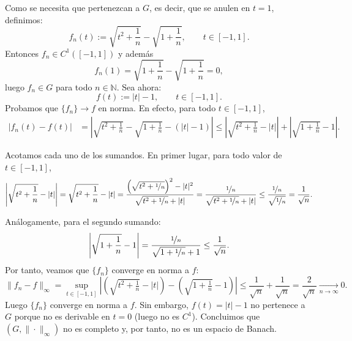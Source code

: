 \documentclass[12pt]{article}
\begin{document}
\begin{ejercicio}[3 puntos]
\begin{enumerate}[label=\alph*)]
\begin{description}
            Como se necesita que pertenezcan a $G$, es decir, que se anulen en $t=1$, definimos:
            \[
            f_n(t):=\sqrt{t^2+\frac{1}{n}}-\sqrt{1+\frac{1}{n}},\qquad t\in[-1,1].
            \]
            Entonces $f_n\in C^1([-1,1])$ y además
            \[
            f_n(1)=\sqrt{1+\frac{1}{n}}-\sqrt{1+\frac{1}{n}}=0,
            \]
            luego $f_n\in G$ para todo $n\in \mathbb{N}$. Sea ahora:
            \[
            f(t):=|t|-1,\qquad t\in[-1,1].
            \]
            Probamos que $\{f_n\}\to f$ en norma. En efecto, para todo $t\in[-1,1]$,
            \begin{align*}
                |f_n(t)-f(t)|
                &= \left|\sqrt{t^2+\frac{1}{n}}-\sqrt{1+\frac{1}{n}}-(|t|-1)\right| \le \left|\sqrt{t^2+\frac{1}{n}}-|t|\right| + \left|\sqrt{1+\frac{1}{n}}-1\right|.
            \end{align*}

            Acotamos cada uno de los sumandos. En primer lugar, para todo valor de $t\in[-1,1]$,
            \begin{align*}
                \left|\sqrt{t^2+\frac{1}{n}}-|t|\right|
                = \sqrt{t^2+\frac{1}{n}}-|t| = \dfrac{\left(\sqrt{t^2+\nicefrac{1}{n}}\right)^2-|t|^2}{\sqrt{t^2+\nicefrac{1}{n}}+|t|}
                = \dfrac{\nicefrac{1}{n}}{\sqrt{t^2+\nicefrac{1}{n}}+|t|} \le \dfrac{\nicefrac{1}{n}}{\sqrt{\nicefrac{1}{n}}} = \dfrac{1}{\sqrt{n}}.
            \end{align*}

            Análogamente, para el segundo sumando:
            \[
            \left|\sqrt{1+\frac1n}-1\right|
            =
            \frac{\nicefrac{1}{n}}{\sqrt{1+\nicefrac{1}{n}}+1}
            \le
            \frac1{\sqrt{n}}.
            \]
            Por tanto, veamos que $\{f_n\}$ converge en norma a $f$:
            \[
            \|f_n-f\|_\infty
            =
            \sup_{t\in[-1,1]}\left| \left(\sqrt{t^2+\tfrac1n}-|t|\right)
            -\left(\sqrt{1+\tfrac1n}-1\right)\right|
            \le
            \frac1{\sqrt{n}}+\frac1{\sqrt{n}}
            =
            \frac{2}{\sqrt{n}}
            \xrightarrow[n\to\infty]{}0.
            \]
            Luego $\{f_n\}$ converge en norma a $f$. Sin embargo, $f(t)=|t|-1$ no pertenece a $G$ porque no es derivable en $t=0$ (luego no es $C^1$).
            Concluimos que $(G,\|\cdot\|_\infty)$ no es completo y, por tanto, no es un espacio de Banach.
            
            \end{description}
            
        \end{enumerate}
    \end{ejercicio}
    \newpage
\end{document}
